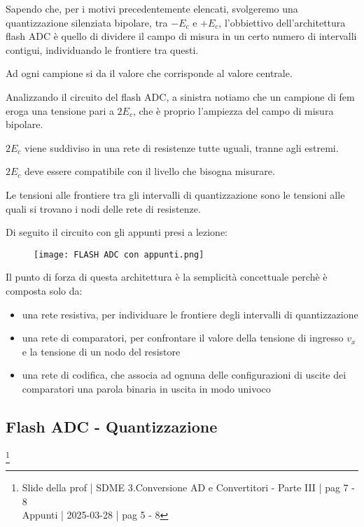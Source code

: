 Sapendo che, per i motivi precedentemente elencati, svolgeremo una quantizzazione silenziata bipolare, 
tra $-E_c$ e $+E_c$, l'obbiettivo dell'architettura flash ADC è quello di dividere il campo di misura in un certo numero di intervalli contigui, 
individuando le frontiere tra questi. \newline 

Ad ogni campione si da il valore che corrisponde al valore centrale. \newline 

Analizzando il circuito del flash ADC, a sinistra notiamo che un campione di fem eroga una tensione pari a $2E_c$, che è proprio l'ampiezza del campo di misura bipolare. \newline 

$2E_c$ viene suddiviso in una rete di resistenze tutte uguali, tranne agli estremi. \newline 

$2E_c$ deve essere compatibile con il livello che bisogna misurare. \newline 

Le tensioni alle frontiere tra gli intervalli di quantizzazione sono le tensioni alle quali si trovano i nodi delle rete di resistenze. \newline 

Di seguito il circuito con gli appunti presi a lezione: 

\begin{figure}[h]
    \centering
    \texttt{[image: FLASH ADC con appunti.png]}
\end{figure}

\newpage 

Il punto di forza di questa architettura è la semplicità concettuale perchè è composta solo da: 

\begin{itemize}
    \item una rete resistiva, per individuare le frontiere degli intervalli di quantizzazione 
    \item una rete di comparatori, per confrontare il valore della tensione di ingresso $v_x$ e la tensione di un nodo del resistore 
    \item una rete di codifica, che associa ad ognuna delle configurazioni di uscite dei comparatori una parola binaria in uscita in modo univoco
\end{itemize}

\newpage

\subsection{Flash ADC - Quantizzazione}
\footnote{Slide della prof | SDME 3.Conversione AD e Convertitori - Parte III | pag 7 - 8\\  
Appunti | 2025-03-28 | pag 5 - 8 }

